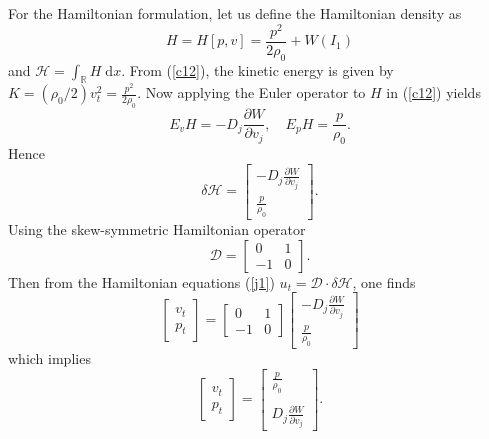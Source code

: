 \documentclass[11pt,letter,subeqn,fleqn]{article}
\numberwithin{equation}{section}
\numberwithin{table}{section}
\numberwithin{figure}{section}
\begin{document}
	For the Hamiltonian formulation, let us define the Hamiltonian density as
	\begin{equation}\label{c12}
	H=H[p,v]=\frac{p^{2}}{2\rho_{0}}+W(I_{1})
	\end{equation}
	and $\mathcal{H}=\int_{\mathbb{R}} H \;\mathrm{d}x$. From (\ref{c12}), the kinetic energy is given by $K=\left(\rho_{0}/2\right)v^{2}_{t}=\frac{p^{2}}{2\rho_{0}}$. Now applying the Euler operator to $H$ in (\ref{c12}) yields
	\begin{equation}\label{c13}
	E_{{v}}H=-D_{j}\frac{\partial W}{\partial v_{j}}, \quad E_{{p}}H=\frac{{p}}{\rho_{0}}.
	\end{equation}
	Hence
	\begin{equation*}
	\delta \mathcal{H} =
	\begin{bmatrix}
	\displaystyle -D_{j}\frac{\partial W}{\partial {v_{j}}}\\
	\displaystyle \frac{{p}}{\rho_{0}}
	\end{bmatrix}.
	\end{equation*}
Using the skew-symmetric Hamiltonian operator
	\begin{equation*}
	\mathcal{D} =
	\begin{bmatrix}
	0&{1}\\
	-{1}&0
	\end{bmatrix}.
	\end{equation*}
	Then from the Hamiltonian equations (\ref{j1}) $u_{t}=\mathcal{D}\cdot \delta\mathcal{H}$, one finds
	\begin{equation*}\label{c17}
	\begin{bmatrix}
	\displaystyle {v}_{t}\\
	\displaystyle {p}_{t}
	\end{bmatrix}	=	\begin{bmatrix}
	\displaystyle 0&1\\
	\displaystyle -1&0
	\end{bmatrix}
	\begin{bmatrix}
	\displaystyle -D_{j}\frac{\partial W}{\partial {v_{j}}}\\
	\displaystyle \frac{{p}}{\rho_{0}}
	\end{bmatrix}
	\end{equation*}
	which implies \begin{equation}\label{c14}
	\begin{bmatrix}
	\displaystyle {v}_{t}\\
	\displaystyle {p}_{t}
	\end{bmatrix}=	
	\displaystyle\begin{bmatrix}
	\displaystyle \frac{{p}}{\rho_{0}}\\\\
	\displaystyle D_{j}\frac{\partial W}{\partial {v_{j}}}
	\end{bmatrix}.
	\end{equation}	
\end{document}
